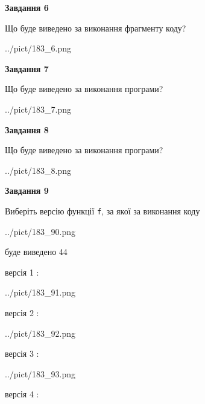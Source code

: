 \documentclass[12pt, ukrainian]{article}
\def\code#1{\Verb!#1!}
\begin{document}
{\begin {large}
{\begin {center}\textbf{Завдання 6}\end {center}}

Що буде виведено за виконання фрагменту коду?\par
\begin{center}
	{../pict/183_6.png}
\end{center}
\newpage

{\begin {center}\textbf{Завдання 7}\end {center}}

Що буде виведено за виконання програми?\par
\begin{center}
	{../pict/183_7.png}
\end{center}
\newpage

{\begin {center}\textbf{Завдання 8}\end {center}}

Що буде виведено за виконання програми?\par
\begin{center}
	{../pict/183_8.png}
\end{center}
\newpage

{\begin {center}\textbf{Завдання 9}\end {center}}

Виберіть версію функції \code{f}, за якої за виконання коду
\begin{center}
	{../pict/183_90.png}
\end{center}
буде виведено 44

\vspace{5mm}
версія 1 :

\begin{center}
	{../pict/183_91.png}
\end{center}
версія 2 :

\begin{center}
	{../pict/183_92.png}
\end{center}
версія 3 :

\begin{center}
	{../pict/183_93.png}
\end{center}
версія 4 :


\end{large}}
\end{document}
